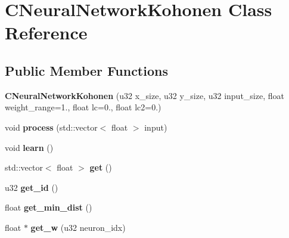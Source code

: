 \hypertarget{classCNeuralNetworkKohonen}{\section{C\-Neural\-Network\-Kohonen Class Reference}
\label{classCNeuralNetworkKohonen}
}
\subsection*{Public Member Functions}
\begin{DoxyCompactItemize}
\item 
\hypertarget{classCNeuralNetworkKohonen_a9978b6a423bb07e6e75a0a99b5f9e6a9}{{\bfseries C\-Neural\-Network\-Kohonen} (u32 x\-\_\-size, u32 y\-\_\-size, u32 input\-\_\-size, float weight\-\_\-range=1., float lc=0., float lc2=0.)}\label{classCNeuralNetworkKohonen_a9978b6a423bb07e6e75a0a99b5f9e6a9}

\item 
\hypertarget{classCNeuralNetworkKohonen_aedfb64b0279469e3eda8a8fdba2c9a64}{void {\bfseries process} (std\-::vector$<$ float $>$ input)}\label{classCNeuralNetworkKohonen_aedfb64b0279469e3eda8a8fdba2c9a64}

\item 
\hypertarget{classCNeuralNetworkKohonen_a3a6267d13a1f0942e069c7e7669c4c6a}{void {\bfseries learn} ()}\label{classCNeuralNetworkKohonen_a3a6267d13a1f0942e069c7e7669c4c6a}

\item 
\hypertarget{classCNeuralNetworkKohonen_a4205bde62ae75e4f5a317e62b1b073a8}{std\-::vector$<$ float $>$ {\bfseries get} ()}\label{classCNeuralNetworkKohonen_a4205bde62ae75e4f5a317e62b1b073a8}

\item 
\hypertarget{classCNeuralNetworkKohonen_a07e36a4b65cb3a348bcd03da7d845bf6}{u32 {\bfseries get\-\_\-id} ()}\label{classCNeuralNetworkKohonen_a07e36a4b65cb3a348bcd03da7d845bf6}

\item 
\hypertarget{classCNeuralNetworkKohonen_ac408122be8c987ec9fe287dcc31c8ba2}{float {\bfseries get\-\_\-min\-\_\-dist} ()}\label{classCNeuralNetworkKohonen_ac408122be8c987ec9fe287dcc31c8ba2}

\item 
\hypertarget{classCNeuralNetworkKohonen_a9f06fb287dd34e5926bfb384c62d5703}{float $\ast$ {\bfseries get\-\_\-w} (u32 neuron\-\_\-idx)}\label{classCNeuralNetworkKohonen_a9f06fb287dd34e5926bfb384c62d5703}

\end{DoxyCompactItemize}


